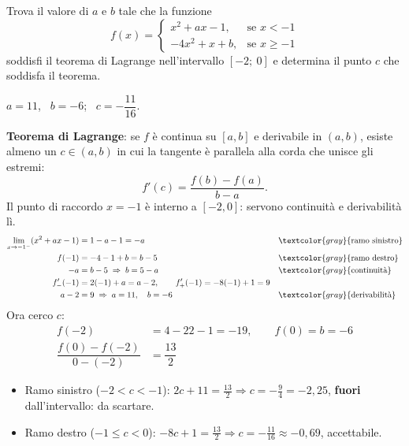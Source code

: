 
\begin{question}[ID=2.3, subtitle={Parametri $a,b$ per Lagrange: funzione a tratti su $[-2,0]$}, tags={lagrange, teoremi, parametrico}, difficulty=difficile]
Trova il valore di \(a\) e \(b\) tale che la funzione
\[
f(x) = \begin{cases}
x^2 +ax-1, & \text{se } x < -1 \\
-4x^2+x+b, & \text{se } x \ge -1
\end{cases}
\]
soddisfi il teorema di Lagrange nell'intervallo \([-2;\ 0]\) e determina il punto \(c\) che soddisfa il teorema.
\begin{solution}
$a=11$, \ $b=-6$; \ $c=-\dfrac{11}{16}$.
\end{solution}
\begin{explanation}
\textbf{Teorema di Lagrange}: se $f$ è continua su $[a,b]$ e derivabile in $(a,b)$, esiste almeno un $c\in(a,b)$ in cui la tangente è parallela alla corda che unisce gli estremi:
\[ f'(c)=\dfrac{f(b)-f(a)}{b-a}. \]
Il punto di raccordo $x=-1$ è interno a $[-2,0]$: servono continuità e derivabilità lì.
\[\begin{aligned}
\lim_{x\to-1^-}(x^2+ax-1) &= 1-a-1=-a && \textcolor{gray}{\text{ramo sinistro}}\\
f(-1) &= -4-1+b=b-5 && \textcolor{gray}{\text{ramo destro}}\\
-a &= b-5 \;\Rightarrow\; b=5-a && \textcolor{gray}{\text{continuità}}\\
f'_-(-1) &= 2(-1)+a=a-2, \qquad f'_+(-1)=-8(-1)+1=9\\
a-2 &= 9 \;\Rightarrow\; a=11, \quad b=-6 && \textcolor{gray}{\text{derivabilità}}
\end{aligned}\]
Ora cerco $c$:
\[\begin{aligned}
f(-2) &= 4-22-1=-19, \qquad f(0)=b=-6\\
\dfrac{f(0)-f(-2)}{0-(-2)} &= \dfrac{13}{2}
\end{aligned}\]
\begin{itemize}
    \item Ramo sinistro ($-2<c<-1$): $2c+11=\tfrac{13}2 \Rightarrow c=-\tfrac94=-2{,}25$, \textbf{fuori} dall'intervallo: da scartare.
    \item Ramo destro ($-1\leq c<0$): $-8c+1=\tfrac{13}2 \Rightarrow c=-\tfrac{11}{16}\approx-0{,}69$, accettabile.
\end{itemize}
\end{explanation}
\end{question}


